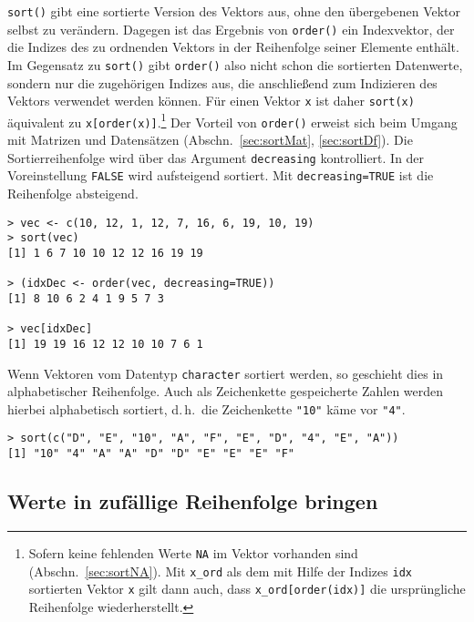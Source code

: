 \lstinline!sort()! gibt eine sortierte Version des Vektors aus, ohne den übergebenen Vektor selbst zu verändern. Dagegen ist das Ergebnis von \lstinline!order()! ein Indexvektor, der die Indizes des zu ordnenden Vektors in der Reihenfolge seiner Elemente enthält. Im Gegensatz zu \lstinline!sort()! gibt \lstinline!order()! also nicht schon die sortierten Datenwerte, sondern nur die zugehörigen Indizes aus, die anschließend zum Indizieren des Vektors verwendet werden können. Für einen Vektor \lstinline!x! ist daher \lstinline!sort(x)! äquivalent zu \lstinline!x[order(x)]!.\footnote{Sofern keine fehlenden Werte \lstinline!NA! im Vektor vorhanden sind (Abschn.\ \ref{sec:sortNA}). Mit \lstinline!x_ord! als dem mit Hilfe der Indizes \lstinline!idx! sortierten Vektor \lstinline!x! gilt dann auch, dass \lstinline!x_ord[order(idx)]! die ursprüngliche Reihenfolge wiederherstellt.} Der Vorteil von \lstinline!order()! erweist sich beim Umgang mit Matrizen und Datensätzen (Abschn.\ \ref{sec:sortMat}, \ref{sec:sortDf}). Die Sortierreihenfolge wird über das Argument \lstinline!decreasing! kontrolliert. In der Voreinstellung \lstinline!FALSE! wird aufsteigend sortiert. Mit \lstinline!decreasing=TRUE! ist die Reihenfolge absteigend.
\begin{lstlisting}
> vec <- c(10, 12, 1, 12, 7, 16, 6, 19, 10, 19)
> sort(vec)
[1] 1 6 7 10 10 12 12 16 19 19

> (idxDec <- order(vec, decreasing=TRUE))
[1] 8 10 6 2 4 1 9 5 7 3

> vec[idxDec]
[1] 19 19 16 12 12 10 10 7 6 1
\end{lstlisting}

Wenn Vektoren vom Datentyp \lstinline!character! sortiert werden, so geschieht dies in alphabetischer Reihenfolge. Auch als Zeichenkette gespeicherte Zahlen werden hierbei alphabetisch sortiert, d.\,h.\ die Zeichenkette \lstinline!"10"! käme vor \lstinline!"4"!.
\begin{lstlisting}
> sort(c("D", "E", "10", "A", "F", "E", "D", "4", "E", "A"))
[1] "10" "4" "A" "A" "D" "D" "E" "E" "E" "F"
\end{lstlisting}

\subsection{Werte in zufällige Reihenfolge bringen}
\label{sec:randOrder}

